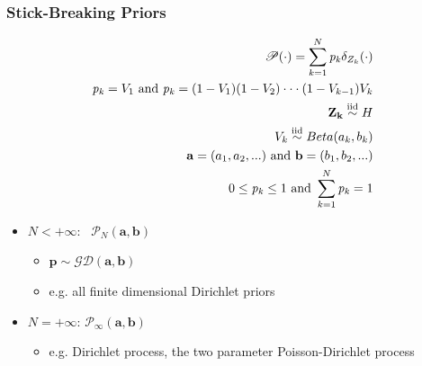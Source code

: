 	

\begin{frame}
	\frametitle{Stick-Breaking Priors}
	\vspace{-15pt}
	\begin{align*}
		\mathscr{P}(\cdot)= \sum\limits_{k=1}^N
		\mathit{p_{k}}\delta_{Z_{k}}(\cdot) \\
		\mathit{p_{k}}=V_{1} \ \text{and} \  \mathit{p_{k}}=(1-V_{1})(1-V_{2}) \cdot \cdot \cdot(1-V_{k-1})V_{k} \\
		\mathbf{Z_{k}}  \iidsim H \\
		V_{k}  \iidsim Beta(a_{k},b_{k}) \\
		\mathbf{a}=(a_{1},a_{2},...) \ \text{and} \  \mathbf{b}=(b_{1},b_{2},...) \\
		0\leq\mathit{p_{k}}\leq1 \ \text{and} \ \sum\limits_{k=1}^N\mathit{p_{k}}=1 
	\end{align*}
	\vspace{-15pt}
	
	    	\begin{itemize}
	    	    \item $N<+\infty$: \ $\mathscr{P}_{N}(\textbf{a},\textbf{b})$
	    	    \begin{itemize}
	    	        \item $\mathbf{p} \sim \mathscr{GD}(\textbf{a},\textbf{b})$
	    	        \item e.g. all finite dimensional Dirichlet priors
	    	    \end{itemize}
	    	    \item $N=+\infty$: $\mathscr{P}_{\infty}(\textbf{a},\textbf{b})$
	    	    \begin{itemize}
	    	        \item e.g. Dirichlet process, the two parameter Poisson-Dirichlet process
	    	    \end{itemize}
	    	\end{itemize}
\end{frame}


